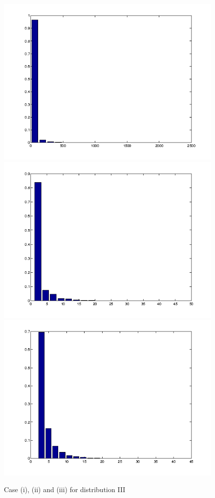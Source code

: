 \begin{figure}[!htbp]
  \includegraphics[width=\textwidth/2]{p3/gen.png}
    \includegraphics[width=\textwidth/2]{p3/pop.png}
  \includegraphics[width=\textwidth/1]{p3/largest.png}
  \caption{Case (i), (ii) and (iii) for distribution III}
  \label{III}
\end{figure}



